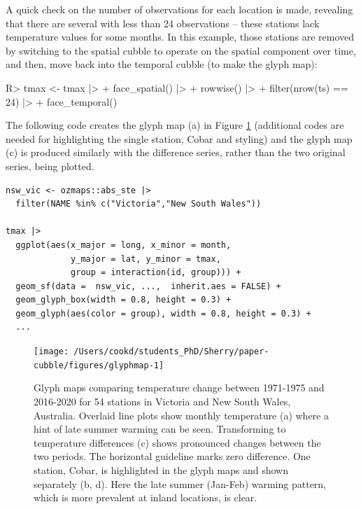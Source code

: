 \documentclass[
  shortnames]{jss}
\begin{document}
A quick check on the number of observations for each location is made, revealing that there are several with less than 24 observations -- these stations lack temperature values for some months. In this example, those stations are removed by switching to the spatial cubble to operate on the spatial component over time, and then, move back into the temporal cubble (to make the glyph map):

\begin{CodeChunk}
\begin{CodeInput}
R> tmax <- tmax |> 
+   face_spatial() |> 
+   rowwise() |>
+   filter(nrow(ts) == 24) |>
+   face_temporal()
\end{CodeInput}
\end{CodeChunk}

The following code creates the glyph map (a) in Figure \ref{fig:glyphmap} (additional codes are needed for highlighting the single station, Cobar and styling) and the glyph map (c) is produced similarly with the difference series, rather than the two original series, being plotted.

\begin{verbatim}
nsw_vic <- ozmaps::abs_ste |> 
  filter(NAME %in% c("Victoria","New South Wales"))

tmax |> 
  ggplot(aes(x_major = long, x_minor = month, 
             y_major = lat, y_minor = tmax,
             group = interaction(id, group))) + 
  geom_sf(data =  nsw_vic, ...,  inherit.aes = FALSE) + 
  geom_glyph_box(width = 0.8, height = 0.3) + 
  geom_glyph(aes(color = group), width = 0.8, height = 0.3) +
  ...
\end{verbatim}

\begin{CodeChunk}
\begin{figure}

{\centering \texttt{[image: /Users/cookd/students\_PhD/Sherry/paper-cubble/figures/glyphmap-1]} 

}

\caption[Glyph maps comparing temperature change between 1971-1975 and 2016-2020 for 54 stations in Victoria and New South Wales, Australia]{Glyph maps comparing temperature change between 1971-1975 and 2016-2020 for 54 stations in Victoria and New South Wales, Australia. Overlaid line plots show monthly temperature (a) where a hint of late summer warming can be seen. Transforming to temperature differences (c) shows pronounced changes between the two periods. The horizontal guideline marks zero difference. One station, Cobar, is highlighted in the glyph maps and shown separately (b, d). Here the late summer (Jan-Feb) warming pattern, which is more prevalent at inland locations, is clear.}\label{fig:glyphmap}
\end{figure}
\end{CodeChunk}
\end{document}
